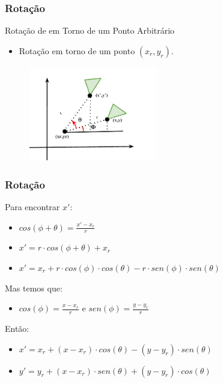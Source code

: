 \documentclass{beamer}
\begin{document}
\begin{frame}
\frametitle{Rotação}


	\begin{block}{Rotação de em Torno de um Ponto Arbitrário}
			\begin{itemize}
				\item Rotação em torno de um ponto $(x_r,y_r)$.
			\end{itemize}
	\end{block}
	
	\begin{figure}[!h]
			\begin{center}
			\includegraphics[width=0.5\textwidth]{Figures/ExemploRotacao3}
			\end{center}
	\end{figure}
	
	
	
\end{frame}


\begin{frame}
\frametitle{Rotação}

	\begin{block}{Para encontrar $x'$:}
		\begin{itemize}
			\item $cos (\phi + \theta) = \frac{x' - x_r}{r}$
			\item $x' = r \cdot cos (\phi + \theta) + x_r $	
			\item $x' = x_r + r \cdot cos(\phi) \cdot cos (\theta) - r \cdot sen(\phi) \cdot sen(\theta)$
		\end{itemize}
	\end{block}
	
	\begin{block}{Mas temos que:}
		\begin{itemize}
			\item $cos (\phi) = \frac{x-x_r}{r}$ e $sen(\phi) =\frac{y - y_r}{r}$ 
		\end{itemize}
	\end{block}
	
	\begin{block}{Então:}
		\begin{itemize}
			\item $x' = x_r + (x - x_r) \cdot cos(\theta) - (y-y_r) \cdot sen(\theta)$
			\item $y' = y_r + (x - x_r) \cdot sen(\theta) + (y-y_r) \cdot cos(\theta)$ 
		\end{itemize}
	\end{block}
	
\end{frame}
\end{document}
